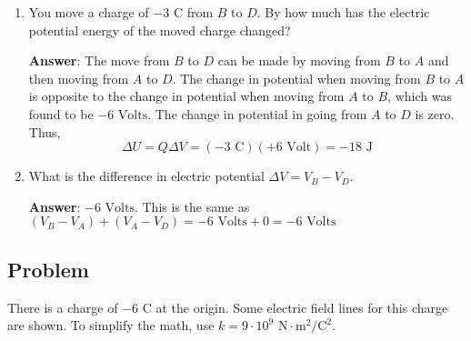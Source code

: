\documentclass{article}
\begin{document}
\begin{enumerate}
  \item You move a charge of $-3\text{ C}$ from $B$ to $D$. By how much has the electric potential energy of the moved charge changed?

        \ifsolutions
        \textbf{Answer}: The move from $B$ to $D$ can be made by moving from $B$ to $A$ and then moving from $A$ to $D$. The change in potential when moving from $B$ to $A$ is opposite to the change in potential when moving from $A$ to $B$, which was found to be $-6\text{ Volts}$. The change in potential in going from $A$ to $D$ is zero. Thus,
        \begin{equation}
        \Delta U = Q\Delta V=(-3\text{ C})(+6\text{ Volt})=-18\text{ J}
        \end{equation}
        \else
        \vskip 48pt
        \fi

  \item What is the difference in electric potential $\Delta V = V_B-V_D$.

        \ifsolutions
        \textbf{Answer}: $-6\text{ Volts}$. This is the same as $(V_B - V_A) + (V_A - V_D) = -6\text{ Volts} + 0 = -6\text{ Volts}$
        \else
        \vskip 48pt
        \fi

\end{enumerate}

\newpage

\subsection{Problem}

There is a charge of $-6\text{ C}$ at the origin. Some electric field lines for this charge are shown. To simplify the math, use $k=9\cdot 10^9\text{ N}\cdot\text{m}^2/\text{C}^2$.


\end{document}
